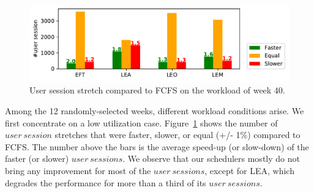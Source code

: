 \documentclass[conference]{IEEEtran}
\newcommand{\us}{\ensuremath{\mathit{user~session}}\xspace}
\newcommand{\uss}{\ensuremath{\mathit{user~sessions}}\xspace}
\begin{document}
\begin{figure}[t]\centering\includegraphics[width=1\linewidth]{../MBSS/plot/Boxplot/byuser/small_hist_stretch_10-03-10-09.pdf}\caption{User session stretch compared to FCFS on the workload of week 40.}\label{smallhist.40}\end{figure}

Among the 12 randomly-selected weeks, different workload conditions
arise. We first concentrate on a low utilization case.
Figure~\ref{smallhist.40} shows the number of \us stretches that were faster, slower, or equal (+/- 1\%) compared to FCFS.
The number above the bars is the average speed-up (or slow-down) of the faster (or slower) \uss.
We observe that our schedulers mostly do not bring any improvement for
most of the \uss, except for LEA, which degrades the performance for
more than a third of its \uss.

\end{document}
